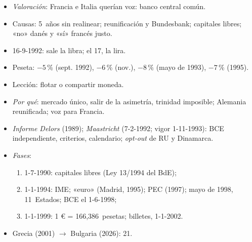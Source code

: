 \documentclass{article}
\begin{document}
\begin{columnas}
\begin{itemize}
\item \emph{Valoración}: Francia e Italia querían voz: banco central común.
\end{itemize}
\begin{itemize}
\item Causas: 5~años sin realinear; reunificación y Bundesbank; capitales libres; «no» danés y «sí» francés justo.
\item 16-9-1992: sale la libra; el 17, la lira.
\item Peseta: $-5$\,\% (sept. 1992), $-6$\,\% (nov.), $-8$\,\% (mayo de 1993), $-7$\,\% (1995).
\item Lección: flotar o compartir moneda.
\end{itemize}

\begin{itemize}
\item \emph{Por qué}: mercado único, salir de la asimetría, trinidad imposible; Alemania reunificada; voz para Francia.
\item \emph{Informe Delors} (1989); \emph{Maastricht} (7-2-1992; vigor 1-11-1993): BCE independiente, criterios, calendario; \emph{opt-out} de RU y Dinamarca.
\item \emph{Fases}:
  \begin{enumerate}
  \item 1-7-1990: capitales libres (Ley 13/1994 del BdE);
  \item 1-1-1994: IME; «euro» (Madrid, 1995); PEC (1997); mayo de 1998, 11~Estados; BCE el 1-6-1998;
  \item 1-1-1999: 1 € = 166,386~pesetas; billetes, 1-1-2002.
  \end{enumerate}
\item Grecia (2001) $\to$ Bulgaria (2026): 21.
\end{itemize}


\end{columnas}
\end{document}
